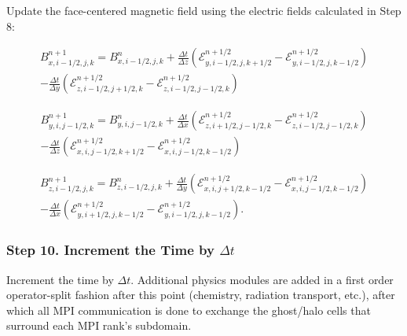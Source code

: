 \documentclass[modern, linenumbers]{aastex631}
\begin{document}
Update the face-centered magnetic field using the electric fields calculated in Step 8:

\begin{equation}
    \begin{aligned}
        B^{n+1}_{x,i-1/2,j,k} = B^{n}_{x,i-1/2,j,k}
        + \frac{\Delta t}{\Delta z} \left( \mathcal{E}^{n+1/2}_{y,i-1/2,j,k+1/2} - \mathcal{E}^{n+1/2}_{y,i-1/2,j,k-1/2} \right) \\
        - \frac{\Delta t}{\Delta y} \left( \mathcal{E}^{n+1/2}_{z,i-1/2,j+1/2,k} - \mathcal{E}^{n+1/2}_{z,i-1/2,j-1/2,k} \right)
    \end{aligned}
\end{equation}

\begin{equation}
    \begin{aligned}
        B^{n+1}_{y,i,j-1/2,k} = B^{n}_{y,i,j-1/2,k}
        + \frac{\Delta t}{\Delta x} \left( \mathcal{E}^{n+1/2}_{z,i+1/2,j-1/2,k} - \mathcal{E}^{n+1/2}_{z,i-1/2,j-1/2,k} \right) \\
        - \frac{\Delta t}{\Delta z} \left( \mathcal{E}^{n+1/2}_{x,i,j-1/2,k+1/2} - \mathcal{E}^{n+1/2}_{x,i,j-1/2,k-1/2} \right)
    \end{aligned}
\end{equation}

\begin{equation}
    \begin{aligned}
        B^{n+1}_{z,i-1/2,j,k} = B^{n}_{z,i-1/2,j,k}
        + \frac{\Delta t}{\Delta y} \left( \mathcal{E}^{n+1/2}_{x,i,j+1/2,k-1/2} - \mathcal{E}^{n+1/2}_{x,i,j-1/2,k-1/2} \right) \\
        - \frac{\Delta t}{\Delta x} \left( \mathcal{E}^{n+1/2}_{y,i+1/2,j,k-1/2} - \mathcal{E}^{n+1/2}_{y,i-1/2,j,k-1/2} \right).
    \end{aligned}
\end{equation}

\subsubsection{Step 10. Increment the Time by \texorpdfstring{$\Delta t$}{dt}}
\label{vlct:increment-time}

Increment the time by $\Delta t$. Additional physics modules are added in a first order operator-split fashion after this point (chemistry, radiation transport, etc.), after which all MPI communication is done to exchange the ghost/halo cells that surround each MPI rank's subdomain.
\end{document}
